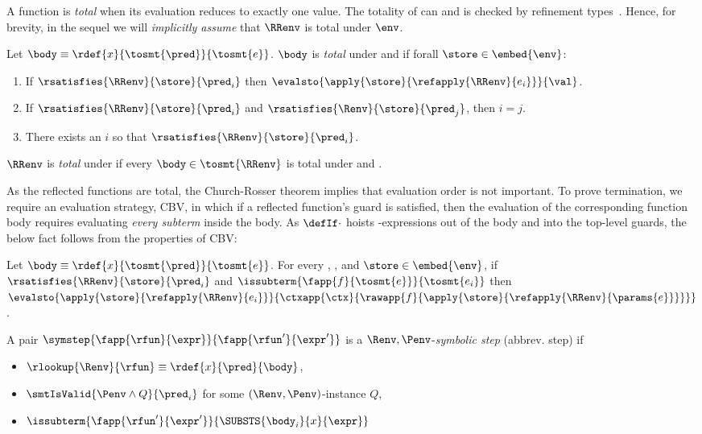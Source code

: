 %
A function is \emph{total} when its evaluation
reduces to exactly one value.
%
The totality of \RRenv can and is checked
by refinement types~\cite{Vazou14}.
%
Hence, for brevity, in the sequel
we will \emph{implicitly assume}
that $\RRenv$ is total under $\env$.
%
\begin{definition}\label{asm:total}
Let $\body \equiv \rdef{x}{\tosmt{\pred}}{\tosmt{e}}$.
$\body$ is \emph{total} under \env and \RRenv if
forall $\store\in \embed{\env}$:
%
\begin{enumerate}
\item If $\rsatisfies{\RRenv}{\store}{\pred_i}$ then
$\evalsto{{\apply{\store}{\refapply{\RRenv}{e_i}}}}{\val}$.
\item If $\rsatisfies{\RRenv}{\store}{\pred_i}$ and $\rsatisfies{\Renv}{\store}{\pred_j}$, then $i=j$.
\item There exists an $i$ so that  $\rsatisfies{\RRenv}{\store}{\pred_i}$.
\end{enumerate}

$\RRenv$ is \emph{total} under \env
if every $\body \in \tosmt{\RRenv}$
is total under \env and \RRenv.
%
\end{definition}

%
As the reflected functions are total,
the Church-Rosser theorem implies that
evaluation order is not important.
%
To prove termination, we require
an evaluation strategy, \eg CBV,
in which if a reflected
function's guard is satisfied,
then the evaluation of the
corresponding function body
requires evaluating
\emph{every subterm}
inside the body.
%
As $\defIf\cdot$ hoists
-expressions out
of the body and into the
top-level guards, the below
fact follows from the
properties of CBV:


\begin{lemma}\label{lem:subterm-eval}
Let $\body \equiv \rdef{x}{\tosmt{\pred}}{\tosmt{e}}$.
%
For every \env, \RRenv, and $\store \in \embed{\env}$,
if $\rsatisfies{\RRenv}{\store}{\pred_i}$ and
   $\issubterm{\fapp{f}{\tosmt{e}}}{\tosmt{e_i}}$
then
   $\evalsto{{\apply{\store}{\refapply{\RRenv}{e_i}}}}{\ctxapp{\ctx}{\rawapp{f}{\apply{\store}{\refapply{\RRenv}{\params{e}}}}}}$.
\end{lemma}

%
A pair
$\symstep{\fapp{\rfun}{\expr}}{\fapp{\rfun'}{\expr'}}$
is a
$\Renv,\Penv$-\emph{symbolic step} (abbrev. step)
if
%
\begin{itemize}
  \item $\rlookup{\Renv}{\rfun} \equiv \rdef{x}{\pred}{\body}$,
  \item $\smtIsValid{\Penv \wedge Q}{\pred_i}$ for some $(\Renv, \Penv)$-instance $Q$,
  \item $\issubterm{\fapp{\rfun'}{\expr'}}{\SUBSTS{\body_i}{x}{\expr}}$
\end{itemize}

